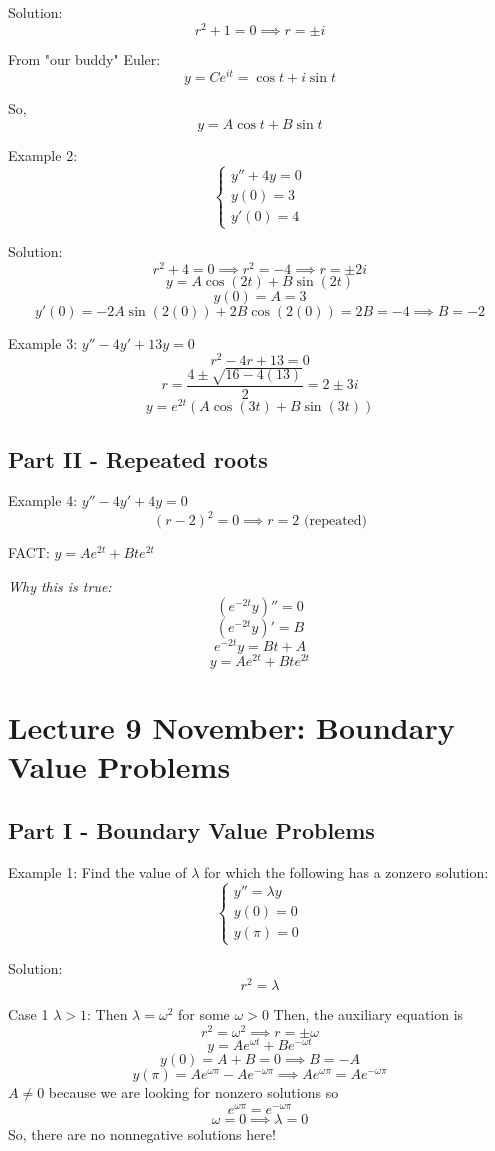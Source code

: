 \documentclass[12pt]{article}
\begin{document}
Solution:
\[r^2 + 1 = 0 \implies r = \pm i \]

From "our buddy" Euler:
\[y = Ce^{it} = \cos t + i \sin t\]

So, 
\[y = A\cos t + B \sin t\]

Example 2: 
\[\begin{cases}
    y'' + 4y = 0\\
    y(0) = 3\\
    y'(0) = 4
\end{cases}\]

Solution:
\[r^2 + 4 = 0 \implies r^2 = -4 \implies r = \pm 2i\]
\[y = A\cos(2t) + B\sin (2t)\]
\[y(0) = A  = 3\]
\[y'(0) = -2A \sin(2(0)) + 2B\cos (2(0)) = 2B = -4 \implies B = -2\]

Example 3: $y'' - 4y' + 13y = 0$
\[r^2 - 4r + 13 = 0\]
\[r = \frac{4 \pm \sqrt{16 - 4(13)}}{2} = 2\pm 3i\]
\[y = e^{2t} (A\cos(3t) + B\sin(3t))\] 

\subsection*{Part II - Repeated roots}
Example 4: $y'' - 4y' + 4y = 0$
\[(r - 2)^2 = 0 \implies r = 2 \text{ (repeated)}\]

FACT: $y = Ae^{2t} + Bte^{2t}$

\emph{Why this is true:} 
\[\left(e^{-2t} y\right)'' = 0\]
\[\left(e^{-2t} y \right)' = B\]
\[e^{-2t} y = Bt + A\]
\[y = Ae^{2t} + Bte^{2t}\]

\section{Lecture 9 November: Boundary Value Problems}
\subsection*{Part I - Boundary Value Problems}
Example 1: Find the value of $\lambda$ for which the following has a zonzero solution:
\[\begin{cases}
    y'' = \lambda y\\
    y(0) = 0\\
    y(\pi) = 0
\end{cases}\]

Solution:
\[r^2 = \lambda\]

Case 1 $\lambda > 1$: Then $\lambda = \omega^2$ for some $\omega > 0$
Then, the auxiliary equation is 
\[r^2 = \omega^2 \implies r = \pm \omega\]
\[y = Ae^{\omega t} + Be^{-\omega t}\]
\[y(0) = A + B = 0 \implies B = - A\]
\[y(\pi) = Ae^{\omega \pi} - Ae^{-\omega \pi} \implies Ae^{\omega \pi} = A e^{-\omega \pi}\]
$A \neq 0$ because we are looking for nonzero solutions so 
\[e^{\omega \pi} = e^{-\omega \pi}\]
\[\omega = 0 \implies \lambda = 0\]
So, there are no nonnegative solutions here!
\end{document}
